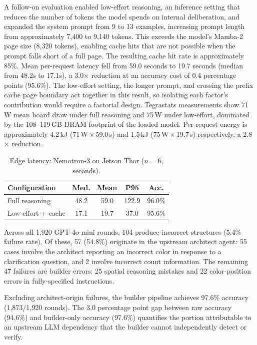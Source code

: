 \documentclass[10pt]{article}
\begin{document}
A follow-on evaluation enabled low-effort reasoning, an inference setting
that reduces the number of tokens the model spends on internal
deliberation, and expanded the system prompt from 9 to 13 examples,
increasing prompt length from approximately 7,400 to 9,140 tokens. This
exceeds the model's Mamba-2 page size (8,320 tokens), enabling cache hits that are not possible when the prompt falls
short of a full page. The resulting cache hit rate is approximately 85\%.
Mean per-request latency fell from 59.0 seconds to 19.7 seconds (median
from 48.2s to 17.1s), a 3.0$\times$ reduction at an accuracy cost of 0.4
percentage points (95.6\%). The low-effort setting, the longer prompt, and
crossing the prefix cache page boundary act together in this result, so
isolating each factor's contribution would require a factorial design.
Tegrastats measurements show 71\,W mean board draw under full reasoning
and 75\,W under low-effort, dominated by the 108--119\,GB DRAM footprint
of the loaded model. Per-request energy is approximately 4.2\,kJ
(71\,W\,$\times$\,59.0\,s) and 1.5\,kJ (75\,W\,$\times$\,19.7\,s)
respectively, a 2.8$\times$ reduction.

\begin{table}[t]
\centering
\small
\caption{Edge latency: Nemotron-3 on Jetson Thor ($n=6$, seconds).}
\begin{tabular}{@{}lcccc@{}}
\toprule
\textbf{Configuration} & \textbf{Med.} & \textbf{Mean} & \textbf{P95} & \textbf{Acc.} \\
\midrule
Full reasoning    & 48.2 & 59.0 & 122.9 & 96.0\% \\
Low-effort + cache & 17.1 & 19.7 & 37.0  & 95.6\% \\
\bottomrule
\end{tabular}
\label{tab:latency}
\end{table}

Across all 1,920 GPT-4o-mini rounds, 104 produce incorrect structures
(5.4\% failure rate). Of these, 57 (54.8\%) originate in the upstream
architect agent: 55 cases involve the architect reporting an incorrect
color in response to a clarification question, and 2 involve incorrect
count information. The remaining 47 failures are builder errors: 25
spatial reasoning mistakes and 22 color-position errors in
fully-specified instructions.

Excluding architect-origin failures, the builder pipeline achieves 97.6\%
accuracy (1,873/1,920 rounds). The 3.0 percentage point gap between raw
accuracy (94.6\%) and builder-only accuracy (97.6\%) quantifies the
portion attributable to an upstream LLM dependency that the builder cannot
independently detect or verify.
\end{document}
